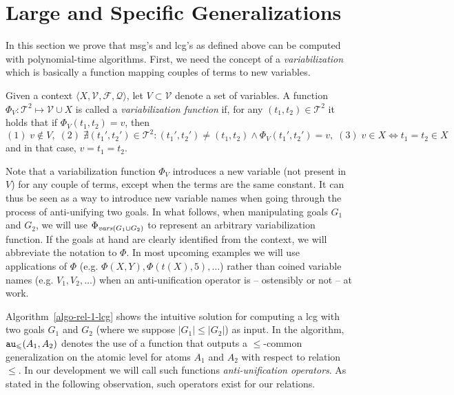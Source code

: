 \section{Large and Specific Generalizations}\label{section-relation-1}

In this section we prove that msg's and lcg's as defined above can be computed with polynomial-time algorithms. First, we need the concept of a \textit{variabilization} which is basically a function mapping couples of terms to new variables. 

\begin{definition}%
	Given a context $\langle X, \mathcal{V}, \mathcal{F}, \mathcal{Q}\rangle$, let
	$V\subset \mathcal{V}$ denote a set of variables. A function $\Phi_V : \mathcal{T}^2\mapsto\mathcal{V}\cup X$ is called a \emph{variabilization function} if, for any $(t_1, t_2)\in\mathcal{T}^2$ it holds that if $\Phi_V(t_1,t_2) = v$, then
	$(1)\; v \notin V,\;(2)\;\nexists (t_1', t_2') \in \mathcal{T}^2 : (t_1', t_2') \neq (t_1, t_2) \wedge \Phi_V(t_1', t_2') = v, \; (3) \; v \in X \Leftrightarrow t_1 = t_2\in X$ and in that case, $v = t_1 = t_2$.
\end{definition}

Note that a variabilization function $\Phi_V$ introduces a new variable (not present in $V$) for any couple of terms, except when the terms are the same constant. It can thus be seen as a way to introduce new variable names when going through the process of anti-unifying two goals. In what follows, when manipulating goals $G_1$ and $G_2$, we will use $\Phi_{\mathit{vars}(G_1\cup G_2)}$ to represent an arbitrary variabilization function. If the goals at hand are clearly identified from the context, we will abbreviate the notation to $\Phi$. In most upcoming examples we will use applications of $\Phi$ (e.g. $\Phi(X,Y), \Phi(t(X), 5),\dots$) rather than coined variable names (e.g. $V_1, V_2,\dots$) when an anti-unification operator is -- ostensibly or not -- at work.

Algorithm~\ref{algo-rel-1-lcg} shows the intuitive solution for computing a lcg with two goals $G_1$ and $G_2$ (where we suppose $|G_1|\le|G_2|$) as input. In the algorithm, $\texttt{au}_\leqslant(A_1,A_2)$ denotes the use of a function that outputs a $\leqslant$-common generalization on the atomic level for atoms $A_1$ and $A_2$ with respect to relation $\leqslant$. In our development we will call such functions \textit{anti-unification operators}. %
As stated in the following observation, such operators exist for our relations.

